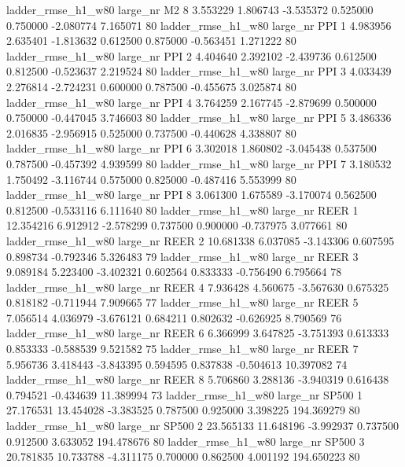  ladder_rmse_h1_w80   large_nr       M2                 8  3.553229  1.806743  -3.535372 0.525000 0.750000 -2.080774    7.165071 80
 ladder_rmse_h1_w80   large_nr      PPI                 1  4.983956  2.635401  -1.813632 0.612500 0.875000 -0.563451    1.271222 80
 ladder_rmse_h1_w80   large_nr      PPI                 2  4.404640  2.392102  -2.439736 0.612500 0.812500 -0.523637    2.219524 80
 ladder_rmse_h1_w80   large_nr      PPI                 3  4.033439  2.276814  -2.724231 0.600000 0.787500 -0.455675    3.025874 80
 ladder_rmse_h1_w80   large_nr      PPI                 4  3.764259  2.167745  -2.879699 0.500000 0.750000 -0.447045    3.746603 80
 ladder_rmse_h1_w80   large_nr      PPI                 5  3.486336  2.016835  -2.956915 0.525000 0.737500 -0.440628    4.338807 80
 ladder_rmse_h1_w80   large_nr      PPI                 6  3.302018  1.860802  -3.045438 0.537500 0.787500 -0.457392    4.939599 80
 ladder_rmse_h1_w80   large_nr      PPI                 7  3.180532  1.750492  -3.116744 0.575000 0.825000 -0.487416    5.553999 80
 ladder_rmse_h1_w80   large_nr      PPI                 8  3.061300  1.675589  -3.170074 0.562500 0.812500 -0.533116    6.111640 80
 ladder_rmse_h1_w80   large_nr     REER                 1 12.354216  6.912912  -2.578299 0.737500 0.900000 -0.737975    3.077661 80
 ladder_rmse_h1_w80   large_nr     REER                 2 10.681338  6.037085  -3.143306 0.607595 0.898734 -0.792346    5.326483 79
 ladder_rmse_h1_w80   large_nr     REER                 3  9.089184  5.223400  -3.402321 0.602564 0.833333 -0.756490    6.795664 78
 ladder_rmse_h1_w80   large_nr     REER                 4  7.936428  4.560675  -3.567630 0.675325 0.818182 -0.711944    7.909665 77
 ladder_rmse_h1_w80   large_nr     REER                 5  7.056514  4.036979  -3.676121 0.684211 0.802632 -0.626925    8.790569 76
 ladder_rmse_h1_w80   large_nr     REER                 6  6.366999  3.647825  -3.751393 0.613333 0.853333 -0.588539    9.521582 75
 ladder_rmse_h1_w80   large_nr     REER                 7  5.956736  3.418443  -3.843395 0.594595 0.837838 -0.504613   10.397082 74
 ladder_rmse_h1_w80   large_nr     REER                 8  5.706860  3.288136  -3.940319 0.616438 0.794521 -0.434639   11.389994 73
 ladder_rmse_h1_w80   large_nr    SP500                 1 27.176531 13.454028  -3.383525 0.787500 0.925000  3.398225  194.369279 80
 ladder_rmse_h1_w80   large_nr    SP500                 2 23.565133 11.648196  -3.992937 0.737500 0.912500  3.633052  194.478676 80
 ladder_rmse_h1_w80   large_nr    SP500                 3 20.781835 10.733788  -4.311175 0.700000 0.862500  4.001192  194.650223 80
